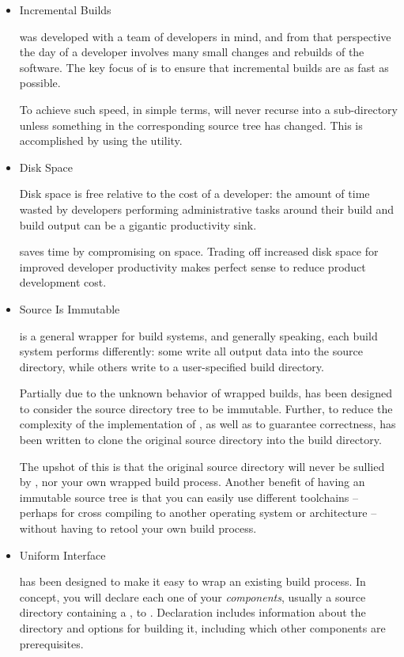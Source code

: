 \begin{itemize}
\item Incremental Builds

  \lmsbw was developed with a team of developers in mind, and from that
  perspective the day of a developer involves many small changes and
  rebuilds of the software.  The key focus of \lmsbw is to ensure that
  incremental builds are as fast as possible.

  To achieve such speed, in simple terms, \lmsbw will never recurse
  into a sub-directory unless something in the corresponding source
  tree has changed.  This is accomplished by using the \mtree utility.

\item Disk Space

  Disk space is free relative to the cost of a developer: the amount
  of time wasted by developers performing administrative tasks around
  their build and build output can be a gigantic productivity sink.

  \lmsbw saves time by compromising on space.  Trading off increased
  disk space for improved developer productivity makes perfect sense
  to reduce product development cost.

\item Source Is Immutable

  \lmsbw is a general wrapper for build systems, and generally
  speaking, each build system performs differently: some write all
  output data into the source directory, while others write to a
  user-specified build directory.

  Partially due to the unknown behavior of wrapped builds, \lmsbw has
  been designed to consider the source directory tree to be immutable.
  Further, to reduce the complexity of the implementation of \lmsbw,
  as well as to guarantee correctness, \lmsbw has been written to
  clone the original source directory into the build directory.

  The upshot of this is that the original source directory will never
  be sullied by \lmsbw, nor your own wrapped build process.  Another
  benefit of having an immutable source tree is that you can easily
  use different toolchains -- perhaps for cross compiling to another
  operating system or architecture -- without having to retool your
  own build process.

\item Uniform Interface

  \lmsbw has been designed to make it easy to wrap an existing build
  process.  In concept, you will declare each one of your
  \emph{components}, usually a source directory containing a
  \makefile, to \lmsbw.  Declaration includes information about the
  directory and options for building it, including which other
  components are prerequisites.


\end{itemize}
